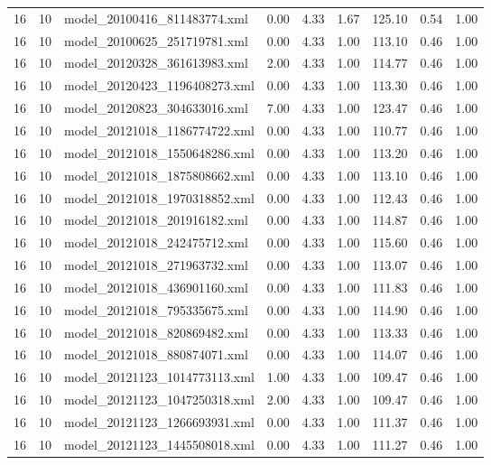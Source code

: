 \begin{table}[ht]
\begin{tabular}{rrlrrrrrr}
   16 &  10 & model\_20100416\_811483774.xml & 0.00 & 4.33 & 1.67 & 125.10 & 0.54 & 1.00 \\ 
   16 &  10 & model\_20100625\_251719781.xml & 0.00 & 4.33 & 1.00 & 113.10 & 0.46 & 1.00 \\ 
   16 &  10 & model\_20120328\_361613983.xml & 2.00 & 4.33 & 1.00 & 114.77 & 0.46 & 1.00 \\ 
   16 &  10 & model\_20120423\_1196408273.xml & 0.00 & 4.33 & 1.00 & 113.30 & 0.46 & 1.00 \\ 
   16 &  10 & model\_20120823\_304633016.xml & 7.00 & 4.33 & 1.00 & 123.47 & 0.46 & 1.00 \\ 
   16 &  10 & model\_20121018\_1186774722.xml & 0.00 & 4.33 & 1.00 & 110.77 & 0.46 & 1.00 \\ 
   16 &  10 & model\_20121018\_1550648286.xml & 0.00 & 4.33 & 1.00 & 113.20 & 0.46 & 1.00 \\ 
   16 &  10 & model\_20121018\_1875808662.xml & 0.00 & 4.33 & 1.00 & 113.10 & 0.46 & 1.00 \\ 
   16 &  10 & model\_20121018\_1970318852.xml & 0.00 & 4.33 & 1.00 & 112.43 & 0.46 & 1.00 \\ 
   16 &  10 & model\_20121018\_201916182.xml & 0.00 & 4.33 & 1.00 & 114.87 & 0.46 & 1.00 \\ 
   16 &  10 & model\_20121018\_242475712.xml & 0.00 & 4.33 & 1.00 & 115.60 & 0.46 & 1.00 \\ 
   16 &  10 & model\_20121018\_271963732.xml & 0.00 & 4.33 & 1.00 & 113.07 & 0.46 & 1.00 \\ 
   16 &  10 & model\_20121018\_436901160.xml & 0.00 & 4.33 & 1.00 & 111.83 & 0.46 & 1.00 \\ 
   16 &  10 & model\_20121018\_795335675.xml & 0.00 & 4.33 & 1.00 & 114.90 & 0.46 & 1.00 \\ 
   16 &  10 & model\_20121018\_820869482.xml & 0.00 & 4.33 & 1.00 & 113.33 & 0.46 & 1.00 \\ 
   16 &  10 & model\_20121018\_880874071.xml & 0.00 & 4.33 & 1.00 & 114.07 & 0.46 & 1.00 \\ 
   16 &  10 & model\_20121123\_1014773113.xml & 1.00 & 4.33 & 1.00 & 109.47 & 0.46 & 1.00 \\ 
   16 &  10 & model\_20121123\_1047250318.xml & 2.00 & 4.33 & 1.00 & 109.47 & 0.46 & 1.00 \\ 
   16 &  10 & model\_20121123\_1266693931.xml & 0.00 & 4.33 & 1.00 & 111.37 & 0.46 & 1.00 \\ 
   16 &  10 & model\_20121123\_1445508018.xml & 0.00 & 4.33 & 1.00 & 111.27 & 0.46 & 1.00 \\ 

\end{tabular}
\end{table}
